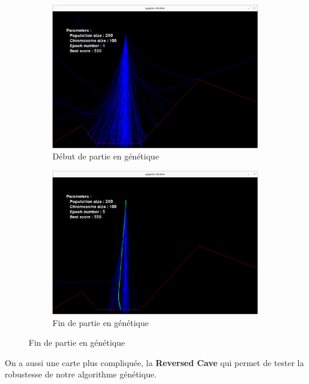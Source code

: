 \documentclass[french,a4paper,10pt,twocolumn]{article}
\begin{document}
\begin{figure}[H]
    \centering
    \begin{subfigure}[b]{0.45\textwidth}
        \centering
        \includegraphics[width=\textwidth]{images/lvl_one_ga.png}
        \caption{Début de partie en génétique}
    \end{subfigure}
    \hfill
    \begin{subfigure}[b]{0.45\textwidth}
        \centering
        \includegraphics[width=\textwidth]{images/successful_lvl_one_ga.png}
        \caption{Fin de partie en génétique}
    \end{subfigure}
\end{figure}

On a aussi une carte plus compliquée, la \textbf{Reversed Cave} qui permet de tester la robustesse de notre algorithme génétique.
\end{document}
